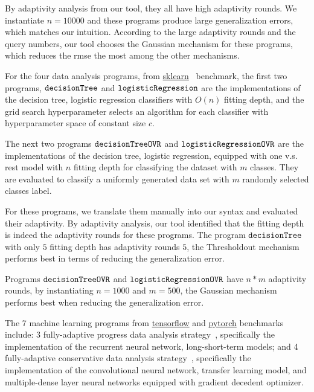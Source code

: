 By adaptivity analysis from our tool, they all have high adaptivity rounds.
We instantiate $n = 10000$ and these programs produce large generalization errors, which matches our intuition.
According to the large adaptivity rounds and the query numbers, our tool chooses the Gaussian mechanism for these programs, which reduces the rmse the most
among the other mechanisms.


For the four data analysis programs, 
from \hyperlink{https://github.com/scikit-learn/scikit-learn/tree/main/examples}{sklearn}~\cite{SklearnBenchmark} benchmark,
the first two programs, $\mathtt{decisionTree}$ and $\mathtt{logisticRegression}$ are
the
implementations of the decision tree, logistic regression classifiers
with $O(n)$ fitting depth,
and the grid search hyperparameter selects an algorithm for each classifier with 
hyperparameter space of constant size $c$.

The next two programs $\mathtt{decisionTreeOVR}$ and $\mathtt{logisticRegressionOVR}$ are
the implementations of the decision tree, logistic regression, equipped with one v.s. rest model with $n$ fitting depth for classifying the dataset with $m$ classes.
They are evaluated to classify a uniformly generated data set with $m$ randomly selected classes label.

For these programs, we translate them manually into our syntax and evaluated their adaptivity.
By adaptivity analysis, our tool identified that the fitting depth is indeed the adaptivity rounds for these programs.
The program $\mathtt{decisionTree}$ with only $5$ fitting depth has adaptivity rounds $5$,
the Thresholdout mechanism performs best in terms of reducing the generalization error.

Programs $\mathtt{decisionTreeOVR}$ and $\mathtt{logisticRegressionOVR}$ 
have $n*m$ adaptivity rounds, by instantiating $n = 1000$ and $m = 500$,
the Gaussian mechanism performs best when reducing the generalization error.








The 7 machine learning programs
from \hyperlink{https://github.com/tensorflow/tensorflow/tree/master/tensorflow/examples}{tensorflow}
and \hyperlink{https://github.com/pytorch/pytorch}{pytorch}
benchmarks include:
3 fully-adaptive progress data analysis
strategy~\cite{ZrnicH19},
specifically the implementation of the recurrent neural network, long-short-term models;
and 4
fully-adaptive conservative data analysis
strategy~\cite{ZrnicH19},
specifically the implementation of the convolutional neural network, transfer learning model,
and multiple-dense layer neural networks equipped with gradient decedent optimizer.

